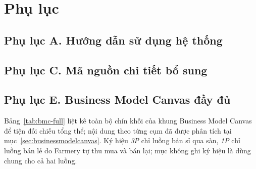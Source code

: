 \chapter*{Phụ lục}

\section*{Phụ lục A. Hướng dẫn sử dụng hệ thống}



\section*{Phụ lục C. Mã nguồn chi tiết bổ sung}



\section*{Phụ lục E. Business Model Canvas đầy đủ}
\label{apdx:bmc}

Bảng~\ref{tab:bmc-full} liệt kê toàn bộ chín khối của khung Business Model
Canvas để tiện đối chiếu tổng thể; nội dung theo từng cụm đã được phân tích
tại mục~\ref{sec:businessmodelcanvas}. Ký hiệu \emph{3P} chỉ luồng bán sỉ qua
sàn, \emph{1P} chỉ luồng bán lẻ do Farmery tự thu mua và bán lại; mục không
ghi ký hiệu là dùng chung cho cả hai luồng.


